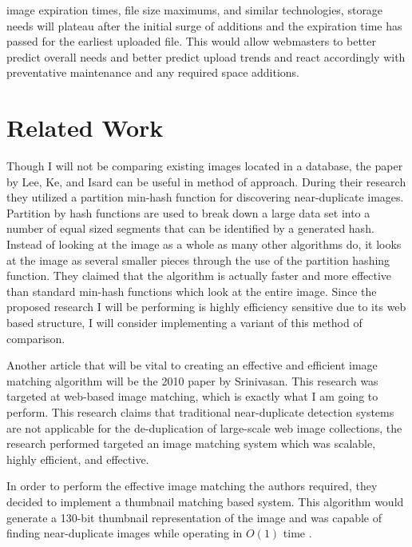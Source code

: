 \documentclass[11pt]{article}
\begin{document}
image expiration times, file size maximums, and similar technologies, storage needs will plateau after the initial surge of additions and the expiration time has passed for the earliest uploaded file. This would allow webmasters to better predict overall needs and better predict upload trends and react accordingly with preventative maintenance and any required space additions.

\vspace*{-.1in}
\section{Related Work}
\label{sec:relatedwork}
\vspace*{-.1in}


Though I will not be comparing existing images located in a database, the paper by Lee, Ke, and Isard \cite{Lee:2010} can be useful in method of approach. During their research they utilized a partition min-hash function for discovering near-duplicate images. Partition by hash functions are used to break down a large data set into a number of equal sized segments that can be identified by a generated hash. Instead of looking at the image as a whole as many other algorithms do, it looks at the image as several smaller pieces through the use of the partition hashing function. They claimed that the algorithm is actually faster and more effective than standard min-hash functions which look at the entire image. Since the proposed research I will be performing is highly efficiency sensitive due to its web based structure, I will consider implementing a variant of this method of comparison.

Another article that will be vital to creating an effective and efficient image matching algorithm will be the 2010 paper by Srinivasan. This research was targeted at web-based image matching, which is exactly what I am going to perform. This research claims that traditional near-duplicate detection systems are not applicable for the de-duplication of large-scale web image collections, \cite{Srinivasan:2008} the research performed targeted an image matching system which was scalable, highly efficient, and effective.

In order to perform the effective image matching the authors required, they decided to implement a thumbnail matching based system. This algorithm would generate a 130-bit thumbnail representation of the image and was capable of finding near-duplicate images while operating in $O(1)$ time \cite{Srinivasan:2008}.
\end{document}
